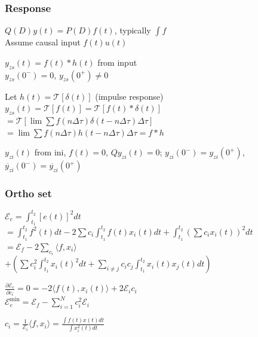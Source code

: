 \documentclass[4pt]{article}
\theoremstyle{definition}
\theoremstyle{definition}
\begin{document}
\begin{landscape}
\begin{multicols}{3}
\subsubsection*{Response}
    $Q(D) y(t) = P(D) f(t)$, typically $\int f$\\
    Assume causal input $f(t) u(t)$

    $y_{zs}(t) = f(t) * h(t)$ from input\\    
        $y_{zs}(0^-) = 0$, $y_{zs}(0^+) \neq 0$

        Let $h(t) = \mathcal{T} [\delta (t)]$ (impulse response)
            $y_{zs}(t)=\mathcal{T} [f(t)] = \mathcal{T} [f(t) * \delta (t)]$\\
            \hspace{2.75em}$=\mathcal{T}[\lim\sum f(n\Delta\tau) \delta(t - n\Delta\tau) \Delta\tau]$\\
            \hspace{2.75em}$=\lim\sum f(n\Delta\tau) h(t-n\Delta\tau)\Delta\tau = f * h$
            
        $y_{zi}(t)$ from ini, $f(t)=0$,
            $Q y_{zi}(t) = 0$;
            $y_{zi}(0^-) = y_{zi}(0^+)$, $\dot{y_{zi}}(0^-) = \dot{y_{zi}}(0^+)$
\subsubsection*{Ortho set}
    $\mathcal{E}_e = \int_{t_1}^{t_2} [e(t)]^2 dt$\\
    $= \int_{t_1}^{t_2} f^2(t)dt - 2\sum c_i \int_{t_1}^{t_2} f(t) x_i(t) dt + \int_{t_1}^{t_2} (\sum c_i x_i(t))^2 dt$\\
    $    = \mathcal{E}_f -  2\sum_{c_i} \langle f, x_i \rangle$\\
    \hspace{1em}$+(\sum c_i^2 \int_{t_1}^{t_2} x_i(t)^2 dt + \sum_{i\neq j} c_i c_j \int_{t_1}^{t_2} x_i(t) x_j(t) dt)$
        
    $\frac{\partial \mathcal{E}_e}{\partial c_i} = 0 = -2 \langle f(t), x_i(t)\rangle + 2\mathcal{E}_i c_i$\\
    $\mathcal{E}_e^{\text{min}} = \mathcal{E}_f - \sum_{i=1}^N c_i^2 \mathcal{E}_i$

    \(c_i = \frac{1}{\mathcal{E}_i}\langle f, x_i\rangle = \frac{\int f(t) x(t) dt}{\int x_i^2(t) dt}\)    


\end{multicols}
\end{landscape}
\end{document}
